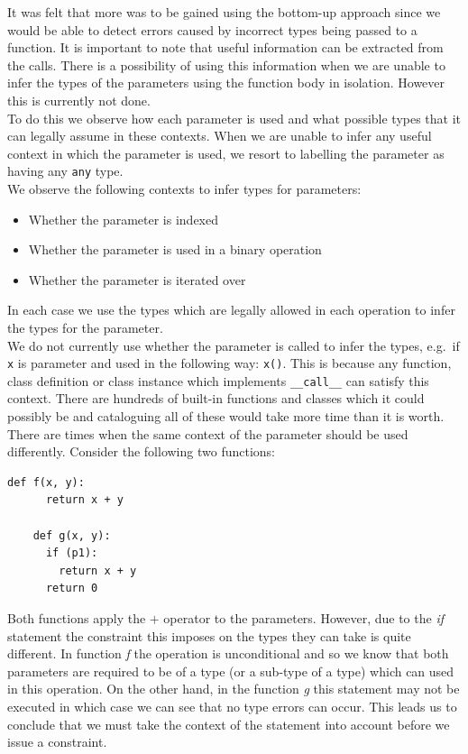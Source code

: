\documentclass[12pt, titlepage]{article}
\begin{document}
It was felt that more was to be gained using the bottom-up approach since we would be able to detect errors caused by incorrect types being passed to a function. It is important to note that useful information can be extracted from the calls. There is a possibility of using this information when we are unable to infer the types of the parameters using the function body in isolation. However this is currently not done. \\
\indent To do this we observe how each parameter is used and what possible types that it can legally assume in these contexts. When we are unable to infer any useful context in which the parameter is used, we resort to labelling the parameter as having any \texttt{any} type. \\
\indent We observe the following contexts to infer types for parameters:
\begin{itemize}
	\item Whether the parameter is indexed
	\item Whether the parameter is used in a binary operation
	\item Whether the parameter is iterated over
\end{itemize}
In each case we use the types which are legally allowed in each operation to infer the types for the parameter. \\
\indent We do not currently use whether the parameter is called to infer the types, e.g.\ if \texttt{x} is parameter and used in the following way: \texttt{x()}. This is because any function, class definition or class instance which implements \texttt{\_\_call\_\_} can satisfy this context. There are hundreds of built-in functions and classes which it could possibly be and cataloguing all of these would take more time than it is worth. \\
\indent There are times when the same context of the parameter should be used differently. Consider the following two functions:
\begin{lstlisting}[mathescape]
	def f(x, y):
	  return x + y
		
	def g(x, y):
	  if (p1):
	    return x + y
	  return 0
\end{lstlisting}
Both functions apply the $+$ operator to the parameters. However, due to the \textit{if} statement the constraint this imposes on the types they can take is quite different. In function \textit{f} the operation is unconditional and so we know that both parameters are required to be of a type (or a sub-type of a type) which can used in this operation. On the other hand, in the function \textit{g} this statement may not be executed in which case we can see that no type errors can occur. This leads us to conclude that we must take the context of the statement into account before we issue a constraint.
\end{document}
